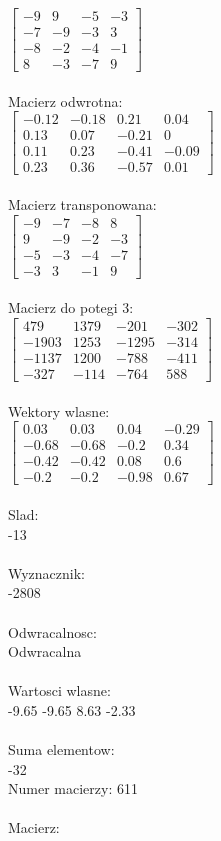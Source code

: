 \documentclass[a4paper,12pt]{article}
\begin{document}
$\begin{bmatrix} -9&9&-5&-3\\-7&-9&-3&3\\-8&-2&-4&-1\\8&-3&-7&9 \end{bmatrix}$
\\
\\
Macierz odwrotna:\\

$\begin{bmatrix} -0.12&-0.18&0.21&0.04\\0.13&0.07&-0.21&0\\0.11&0.23&-0.41&-0.09\\0.23&0.36&-0.57&0.01 \end{bmatrix}$
\\
\\
Macierz transponowana:\\

$\begin{bmatrix} -9&-7&-8&8\\9&-9&-2&-3\\-5&-3&-4&-7\\-3&3&-1&9 \end{bmatrix}$
\\
\\
Macierz do potegi 3:\\

$\begin{bmatrix} 479&1379&-201&-302\\-1903&1253&-1295&-314\\-1137&1200&-788&-411\\-327&-114&-764&588 \end{bmatrix}$
\\
\\
Wektory wlasne:\\

$\begin{bmatrix} 0.03&0.03&0.04&-0.29\\-0.68&-0.68&-0.2&0.34\\-0.42&-0.42&0.08&0.6\\-0.2&-0.2&-0.98&0.67 \end{bmatrix}$
\\
\\
Slad:\\
-13
\\
\\
Wyznacznik:\\
-2808
\\
\\
Odwracalnosc:\\
Odwracalna
\\
\\
Wartosci wlasne:\\
-9.65 -9.65 8.63 -2.33
\\
\\
Suma elementow:\\
-32
\\
\newpage
Numer macierzy:
611
\\
\\
Macierz:\\
\end{document}

